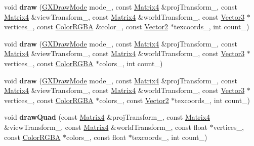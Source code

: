 \begin{DoxyCompactItemize}
\item 
void {\bfseries draw} (\hyperlink{class_magnum_1_1_g_x_draw_mode}{G\+X\+Draw\+Mode} mode\+\_\+, const \hyperlink{class_magnum_1_1_matrix4}{Matrix4} \&proj\+Transform\+\_\+, const \hyperlink{class_magnum_1_1_matrix4}{Matrix4} \&view\+Transform\+\_\+, const \hyperlink{class_magnum_1_1_matrix4}{Matrix4} \&world\+Transform\+\_\+, const \hyperlink{class_magnum_1_1_vector3}{Vector3} $\ast$vertices\+\_\+, const \hyperlink{class_magnum_1_1_color_r_g_b_a}{Color\+R\+G\+BA} \&color\+\_\+, const \hyperlink{class_magnum_1_1_vector2}{Vector2} $\ast$texcoords\+\_\+, int count\+\_\+)\hypertarget{class_magnum_1_1_g_x_context_af36b043da46fb937c9aa98108d8de178}{}\label{class_magnum_1_1_g_x_context_af36b043da46fb937c9aa98108d8de178}

\item 
void {\bfseries draw} (\hyperlink{class_magnum_1_1_g_x_draw_mode}{G\+X\+Draw\+Mode} mode\+\_\+, const \hyperlink{class_magnum_1_1_matrix4}{Matrix4} \&proj\+Transform\+\_\+, const \hyperlink{class_magnum_1_1_matrix4}{Matrix4} \&view\+Transform\+\_\+, const \hyperlink{class_magnum_1_1_matrix4}{Matrix4} \&world\+Transform\+\_\+, const \hyperlink{class_magnum_1_1_vector3}{Vector3} $\ast$vertices\+\_\+, const \hyperlink{class_magnum_1_1_color_r_g_b_a}{Color\+R\+G\+BA} $\ast$colors\+\_\+, int count\+\_\+)\hypertarget{class_magnum_1_1_g_x_context_a3e245440e97e8c266d894c87a7fe6f38}{}\label{class_magnum_1_1_g_x_context_a3e245440e97e8c266d894c87a7fe6f38}

\item 
void {\bfseries draw} (\hyperlink{class_magnum_1_1_g_x_draw_mode}{G\+X\+Draw\+Mode} mode\+\_\+, const \hyperlink{class_magnum_1_1_matrix4}{Matrix4} \&proj\+Transform\+\_\+, const \hyperlink{class_magnum_1_1_matrix4}{Matrix4} \&view\+Transform\+\_\+, const \hyperlink{class_magnum_1_1_matrix4}{Matrix4} \&world\+Transform\+\_\+, const \hyperlink{class_magnum_1_1_vector3}{Vector3} $\ast$vertices\+\_\+, const \hyperlink{class_magnum_1_1_color_r_g_b_a}{Color\+R\+G\+BA} $\ast$colors\+\_\+, const \hyperlink{class_magnum_1_1_vector2}{Vector2} $\ast$texcoords\+\_\+, int count\+\_\+)\hypertarget{class_magnum_1_1_g_x_context_a24ae804ad64d1ff2f0e7763aa2208b23}{}\label{class_magnum_1_1_g_x_context_a24ae804ad64d1ff2f0e7763aa2208b23}

\item 
void {\bfseries draw\+Quad} (const \hyperlink{class_magnum_1_1_matrix4}{Matrix4} \&proj\+Transform\+\_\+, const \hyperlink{class_magnum_1_1_matrix4}{Matrix4} \&view\+Transform\+\_\+, const \hyperlink{class_magnum_1_1_matrix4}{Matrix4} \&world\+Transform\+\_\+, const float $\ast$vertices\+\_\+, const \hyperlink{class_magnum_1_1_color_r_g_b_a}{Color\+R\+G\+BA} $\ast$colors\+\_\+, const float $\ast$texcoords\+\_\+, int count\+\_\+)\hypertarget{class_magnum_1_1_g_x_context_a66f38f58592a36bc0bc708137cac73ca}{}\label{class_magnum_1_1_g_x_context_a66f38f58592a36bc0bc708137cac73ca}


\end{DoxyCompactItemize}
